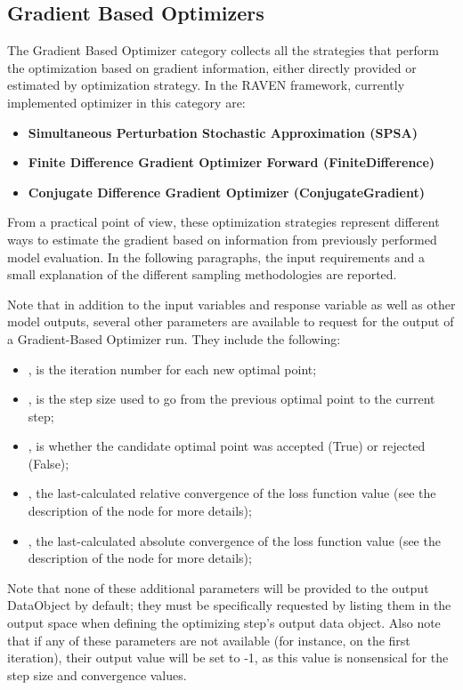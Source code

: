 \subsection{Gradient Based Optimizers}
\label{subsec:gradientBasedOptimizers}
The Gradient Based Optimizer category collects all the strategies that perform the optimization based on gradient information,
 either directly provided or estimated by optimization strategy. In the RAVEN framework, currently implemented optimizer in this
 category are:
\begin{itemize}
\item \textbf{Simultaneous Perturbation Stochastic Approximation (SPSA)}
\item \textbf{Finite Difference Gradient Optimizer Forward (FiniteDifference)}
\item \textbf{Conjugate Difference Gradient Optimizer (ConjugateGradient)}

\end{itemize}

From a practical point of view, these optimization strategies represent different ways to estimate the gradient based on information
from previously performed model evaluation. In the following paragraphs, the input requirements and a small explanation of the
different sampling methodologies are reported.

Note that in addition to the input variables and response variable as well as other model outputs, several
other parameters are available to
request for the output of a Gradient-Based Optimizer run.  They include the following:
\begin{itemize}
  \item {}, is the iteration number for each new optimal point;
  \item {}, is the step size used to go from the previous optimal point to the current step;
  \item {}, is whether the candidate optimal point was accepted (True) or rejected (False);
  \item {}, the last-calculated relative convergence of the loss function value
    (see the description of the  node for more details);
  \item {}, the last-calculated absolute convergence of the loss function value
    (see the description of the  node for more details);
\end{itemize}
Note that none of these additional parameters will be provided to the output DataObject by default; they must
be specifically requested by listing them in the output space when defining the optimizing step's output data
object.  Also note that if any of these parameters are not available (for instance, on the first iteration),
their output value will be set to -1, as this value is nonsensical for the step size and convergence values.

